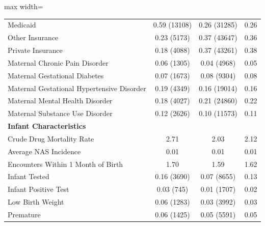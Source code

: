 \begin{table}[ht]
\begin{adjustbox}{max width=\textwidth}
\begin{tabular}{lccc}
\hspace{1em}Medicaid & 0.59 (13108) & 0.26 (31285) & 0.26 \\
\hspace{1em}Other Insurance & 0.23 (5173) & 0.37 (43647) & 0.36 \\
\hspace{1em}Private Insurance & 0.18 (4088) & 0.37 (43261) & 0.38 \\
\hspace{1em}Maternal Chronic Pain Disorder & 0.06 (1305) & 0.04 (4968) & 0.05 \\
\hspace{1em}Maternal Gestational Diabetes & 0.07 (1673) & 0.08 (9304) & 0.08 \\
\hspace{1em}Maternal Gestational Hypertensive Disorder & 0.19 (4349) & 0.16 (19014) & 0.16 \\
\hspace{1em}Maternal Mental Health Disorder & 0.18 (4027) & 0.21 (24860) & 0.22 \\
\hspace{1em}Maternal Substance Use Disorder & 0.12 (2626) & 0.10 (11573) & 0.11 \\
\midrule
\multicolumn{4}{l}{\textbf{Infant Characteristics}} \\
\hspace{1em} Crude Drug Mortality Rate & 2.71 & 2.03 & 2.12 \\
\hspace{1em}Average NAS Incidence & 0.01 & 0.01 & 0.01 \\
\hspace{1em}Encounters Within 1 Month of Birth & 1.70 & 1.59 & 1.62 \\
\hspace{1em}Infant Tested & 0.16 (3690) & 0.07 (8655) & 0.13 \\
\hspace{1em}Infant Positive Test & 0.03 (745) & 0.01 (1707) & 0.02 \\
\hspace{1em}Low Birth Weight & 0.06 (1283) & 0.03 (3992) & 0.03 \\
\hspace{1em}Premature & 0.06 (1425) & 0.05 (5591) & 0.05 \\
\bottomrule
\end{tabular}
\end{adjustbox}
\end{table}
